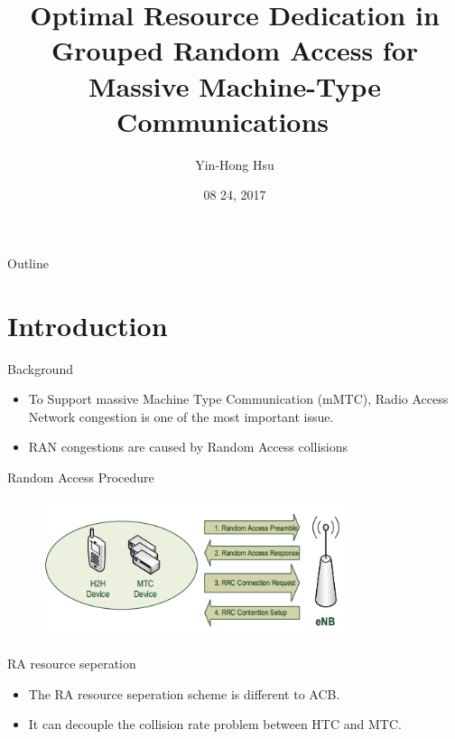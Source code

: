 \documentclass{beamer}
\title {
    Optimal Resource Dedication in Grouped Random Access for Massive Machine-Type Communications ~\cite{1707.09811}
}
\author {
    Yin-Hong Hsu
}
\date {
    08 24, 2017
}
\begin{document}
\begin{frame}
    \titlepage
\end{frame}


\begin{frame}{Outline}
    \tableofcontentsgather
    \tableofcontents
\end{frame}

\section{Introduction}
\begin{frame} {Background}
    \begin{itemize}
        \item {To Support massive Machine Type Communication (mMTC), Radio Access Network congestion is one of the most important issue.}
        \item {RAN congestions are caused by Random Access collisions}
    \end{itemize}
\end{frame}
\begin{frame} {Random Access Procedure}  
    \begin{figure}[t]
    \centering
    \includegraphics[width=0.8\textwidth]{figures/RAP.png}
    \end{figure}
\end{frame}
\begin{frame} {RA resource seperation}
    \begin{itemize}
        \item {The RA resource seperation scheme is different to ACB.}
        \item {It can decouple the collision rate problem between HTC and MTC.}
    \end{itemize}
\end{frame}
\end{document}
